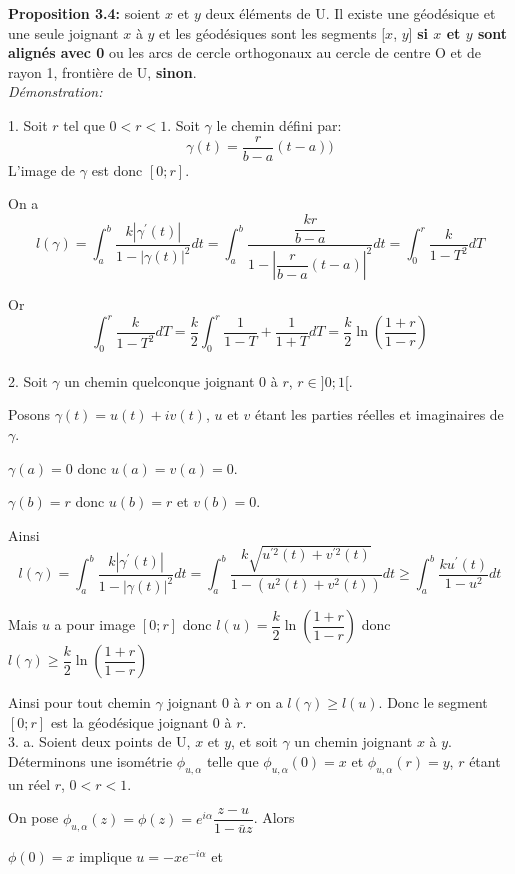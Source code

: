 \documentclass[a4paper, 12pt, twoside]{book}
\begin{document}
  \textbf{Proposition 3.4:} soient $x$ et $y$ deux éléments de U. Il existe une géodésique et une seule joignant $x$ à $y$ et les géodésiques sont les segments [$x$, $y$] \textbf{si $x$ et $y$ sont alignés avec 0} ou les arcs de cercle orthogonaux au cercle de centre O et de rayon 1, frontière de U, \textbf{sinon}.\\
  
  \textit{Démonstration:} \
  
  1. Soit $r$ tel que $0<r<1$. Soit $\gamma$ le chemin défini par: $$\gamma(t)=\dfrac{r}{b-a}(t-a))$$ L'image de $\gamma$ est donc $[0; r]$.
 
  On a $$l(\gamma)=\int_{a}^{b}\dfrac{k|\gamma^{'}(t)|}{1-|\gamma(t)|^{2}}dt=\int_{a}^{b}\dfrac{\dfrac{kr}{b-a}}{1-|\dfrac{r}{b-a}(t-a)|^{2}}dt=\int_{0}^{r}\dfrac{k}{1-T^{2}}dT$$
  
  Or $$\int_{0}^{r}\dfrac{k}{1-T^{2}}dT=\dfrac{k}{2}\int_{0}^{r}\dfrac{1}{1-T}+\dfrac{1}{1+T}dT=\dfrac{k}{2}\ln (\dfrac{1+r}{1-r})$$\\
  
  2. Soit $\gamma$ un chemin quelconque joignant 0 à $r$, $r\in ]0; 1[$.
  
   Posons $\gamma(t)=u(t)+iv(t)$, $u$ et $v$ étant les parties réelles et imaginaires de $\gamma$.
   
   $\gamma(a)=0$ donc $u(a)=v(a)=0$.
   
   $\gamma(b)=r$ donc $u(b)=r$ et $v(b)=0$.
   
   Ainsi $$l(\gamma)=\int_{a}^{b}\dfrac{k|\gamma^{'}(t)|}{1-|\gamma(t)|^{2}}dt=\int_{a}^{b}\dfrac{k\sqrt{u^{'2}(t)+v^{'2}(t)}}{1-(u^{2}(t)+v^{2}(t))}dt\geq \int_{a}^{b}\dfrac{ku^{'}(t)}{1-u^{2}}dt $$
   
   Mais $u$ a pour image $[0; r]$ donc $l(u)=\dfrac{k}{2}\ln (\dfrac{1+r}{1-r})$ donc $l(\gamma)\geq \dfrac{k}{2}\ln (\dfrac{1+r}{1-r})$
   
   Ainsi pour tout chemin $\gamma$ joignant 0 à $r$ on a $l(\gamma)\geq l(u)$. Donc le segment $[0; r]$ est la géodésique joignant 0 à $r$.\\
   
 
  3. a. Soient deux points de U, $x$ et $y$, et soit $\gamma$ un chemin joignant $x$ à $y$. Déterminons une isométrie $\phi_{u, \alpha}$ telle que $\phi_{u, \alpha}(0)=x$ et  $\phi_{u, \alpha}(r)=y$, $r$ étant un réel $r$, $0<r<1$.\
   
   On pose $\phi_{u, \alpha}(z)=\phi(z)=e^{i\alpha}\dfrac{z-u}{1-\bar{u}z}$. Alors\
   
    $\phi(0)=x$ implique $u=-xe^{-i\alpha}$ et \
    
\end{document}
